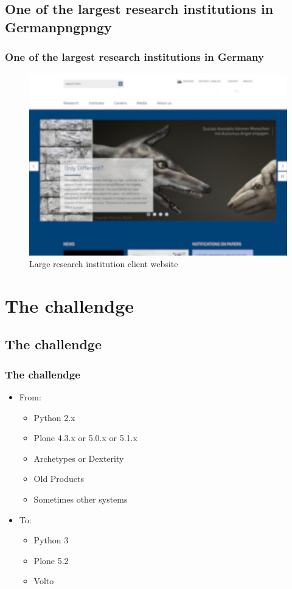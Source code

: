 \documentclass[aspectratio=169]{beamer}
\begin{document}
\subsection{One of the largest research institutions in Germanpngpngy}
\begin{frame}
  \frametitle{One of the largest research institutions in Germany}
  \begin{figure}
    \includegraphics[height=.7\textheight]{./img/005_-_research_institution.jpg}
    \caption{Large research institution client website}
  \end{figure}
\end{frame}

\section{The challendge}
\subsection{The challendge}
\begin{frame}
  \frametitle{The challendge}
  \begin{itemize}
    \item From:
    \begin{itemize}
      \item Python 2.x \pause
      \item Plone 4.3.x or 5.0.x or 5.1.x \pause
      \item Archetypes or Dexterity \pause
      \item Old Products \pause
      \item Sometimes other systems \pause
    \end{itemize}
    \item To:
    \begin{itemize}
      \item Python 3 \pause
      \item Plone 5.2 \pause
      \item Volto
    \end{itemize}
  \end{itemize}
\end{frame}
\end{document}
